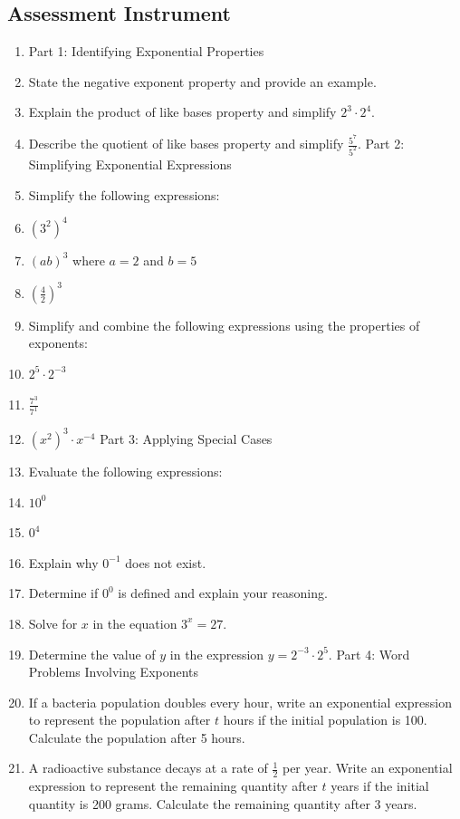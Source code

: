\subsection{Assessment Instrument}

\begin{enumerate}
    \item Part 1: Identifying Exponential Properties
    \item State the negative exponent property and provide an example.
    \item Explain the product of like bases property and simplify $2^3 \cdot 2^4$.
    \item Describe the quotient of like bases property and simplify $\frac{5^7}{5^2}$. Part 2: Simplifying Exponential Expressions
    \item Simplify the following expressions:
    \item $(3^2)^4$
    \item $(ab)^3$ where $a = 2$ and $b = 5$
    \item $\left(\frac{4}{2}\right)^3$
    \item Simplify and combine the following expressions using the properties of exponents:
    \item $2^5 \cdot 2^{-3}$
    \item $\frac{7^3}{7^1}$
    \item $(x^2)^3 \cdot x^{-4}$ Part 3: Applying Special Cases
    \item Evaluate the following expressions:
    \item $10^0$
    \item $0^4$
    \item Explain why $0^{-1}$ does not exist.
    \item Determine if $0^0$ is defined and explain your reasoning.
    \item Solve for $x$ in the equation $3^x = 27$.
    \item Determine the value of $y$ in the expression $y = 2^{-3} \cdot 2^5$. Part 4: Word Problems Involving Exponents
    \item If a bacteria population doubles every hour, write an exponential expression to represent the population after $t$ hours if the initial population is 100. Calculate the population after 5 hours.
    \item A radioactive substance decays at a rate of $\frac{1}{2}$ per year. Write an exponential expression to represent the remaining quantity after $t$ years if the initial quantity is 200 grams. Calculate the remaining quantity after 3 years.
\end{enumerate}

